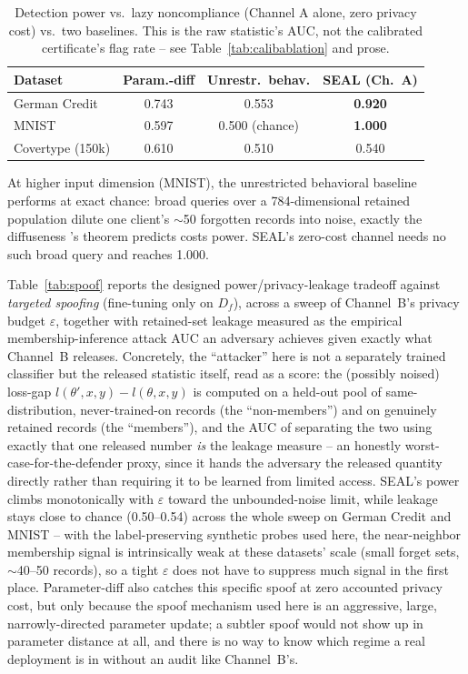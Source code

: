 \documentclass[10pt,journal,compsoc]{IEEEtran}
\begin{document}
\begin{table}[t]
\centering
\footnotesize
\caption{Detection power vs.\ lazy noncompliance (Channel A alone, zero privacy cost) vs.\ two baselines. This is the raw statistic's AUC, not the calibrated certificate's flag rate -- see Table~\ref{tab:calibablation} and prose.}
\label{tab:classical}
\begin{tabular}{@{}lccc@{}}
\toprule
Dataset & Param.-diff & Unrestr.\ behav. & SEAL (Ch.\ A) \\
\midrule
German Credit & 0.743 & 0.553 & \textbf{0.920} \\
MNIST & 0.597 & 0.500 (chance) & \textbf{1.000} \\
Covertype (150k) & 0.610 & 0.510 & 0.540 \\
\bottomrule
\end{tabular}
\end{table}

At higher input dimension (MNIST), the unrestricted behavioral baseline performs at exact chance: broad queries over a 784-dimensional retained population dilute one client's $\sim$50 forgotten records into noise, exactly the diffuseness \cite{tang2026geometric}'s theorem predicts costs power. SEAL's zero-cost channel needs no such broad query and reaches 1.000.

Table~\ref{tab:spoof} reports the designed power/privacy-leakage tradeoff against \emph{targeted spoofing} (fine-tuning only on $D_f$), across a sweep of Channel~B's privacy budget $\varepsilon$, together with retained-set leakage measured as the empirical membership-inference attack AUC an adversary achieves given exactly what Channel~B releases. Concretely, the ``attacker'' here is not a separately trained classifier but the released statistic itself, read as a score: the (possibly noised) loss-gap $l(\theta',x,y)-l(\theta,x,y)$ is computed on a held-out pool of same-distribution, never-trained-on records (the ``non-members'') and on genuinely retained records (the ``members''), and the AUC of separating the two using exactly that one released number \emph{is} the leakage measure -- an honestly worst-case-for-the-defender proxy, since it hands the adversary the released quantity directly rather than requiring it to be learned from limited access. SEAL's power climbs monotonically with $\varepsilon$ toward the unbounded-noise limit, while leakage stays close to chance (0.50--0.54) across the whole sweep on German Credit and MNIST -- with the label-preserving synthetic probes used here, the near-neighbor membership signal is intrinsically weak at these datasets' scale (small forget sets, $\sim$40--50 records), so a tight $\varepsilon$ does not have to suppress much signal in the first place. Parameter-diff also catches this specific spoof at zero accounted privacy cost, but only because the spoof mechanism used here is an aggressive, large, narrowly-directed parameter update; a subtler spoof would not show up in parameter distance at all, and there is no way to know which regime a real deployment is in without an audit like Channel~B's.
\end{document}
